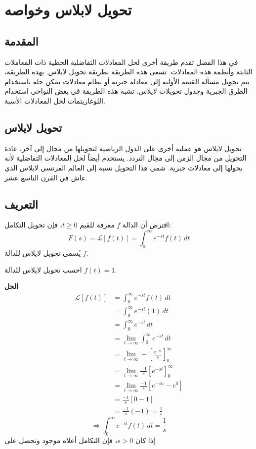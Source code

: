 \chapter{تحويل لابلاس وخواصه}

\section*{المقدمة}
في هذا الفصل تقدم طريقة أخرى لحل المعادلات التفاضلية الخطية ذات المعاملات الثابتة وأنظمة هذه المعادلات. تسعى هذه الطريقة بطريقة تحويل لايلاس. يهذه الطريقة، يتم تحويل مسألة القيمة الأولية إلى معادلة جبرية أو نظام معادلات يمكن حله باستخدام الطرق الجبرية وجدول تحويلات لايلاس. تشبه هذه الطريقة في بعض النواحي استخدام اللوغاريتمات لحل المعادلات الأسبة.

\section{ تحويل لايلاس}
تحويل لايلاس هو عملية أخرى على الدول الرياضية لتحويلها من مجال إلى آخر، عادة التحويل من مجال الزمن إلى مجال التردد. يستخدم أيضاً لحل المعادلات التفاضلية لأنه يحولها إلى معادلات جبرية. شمي هذا التحويل نسبة إلى العالم الفرنسي لايلاس الذي عاش في القرن التاسع عشر.

\section{التعريف }
افترض أن الدالة \( f \) معرفة للقيم \( t \geq 0 \)، فإن تحويل التكامل:
\[
F(s) = \mathcal{L}[f(t)] = \int_{0}^{\infty} e^{-st}f(t) \, dt
\]
يُسمى تحويل لايلاس للدالة \( f \).

\begin{example}
احسب تحويل لايلاس للدالة \( f(t) = 1 \).
\end{example}
\noindent
\textbf{الحل}
\begin{align*}
\mathcal{L}[f(t)] &= \int_{0}^{\infty} e^{-st}f(t) \, dt
\\
&= \int_{0}^{\infty} e^{-st}(1) \, dt
\\
&= \int_{0}^{\infty} e^{-st} \, dt
\\
&= \lim_{t \to \infty} \int_0^\infty e^{-st} \, dt
\\
&= \lim_{t \to \infty} - \left[ \frac{e^{-st}}{s} \right]_0^\infty
\\
&= \lim_{t \to \infty} \frac{-1}{s} \left[ e^{-st} \right]_0^\infty
\\
&= \lim_{t \to \infty} \frac{-1}{s} \left[ e^{-\infty} - e^0 \right]
\\
&= \frac{-1}{s} \left[ 0 - 1 \right]
\\
&= \frac{-1}{s} (-1) = \frac{1}{s}
\end{align*}
\[
\Rightarrow\int_0^\infty e^{-st} f(t) \, dt = \frac{1}{s}
\]
\noindent
إذا كان \( s > 0 \)، فإن التكامل أعلاه موجود ونحصل على

